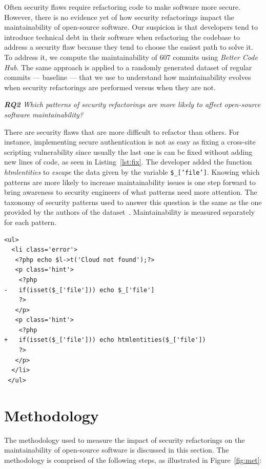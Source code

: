\documentclass[10pt,conference]{IEEEtran}
\newcounter{lstannotation}
\begin{document}
Often security flaws require refactoring code to make software more secure.
However, there is no evidence yet of how security refactorings impact the
maintainability of open-source software. Our suspicion is that developers tend
to introduce technical debt in their software when refactoring the codebase to
address a security flaw because they tend to choose the easiest path to solve
it. To address it, we compute the maintainability of $607$ commits using
\emph{Better Code Hub}. The same approach is applied to a randomly generated
dataset of regular commits --- baseline --- that we use to understand how
maintainability evolves when security refactorings are performed versus when
they are not.

\begin{framed}
\textit{\textbf{RQ2} Which patterns of security refactorings are more likely to
affect open-source software maintainability?}
\end{framed}

There are security flaws that are more difficult to refactor than others. For
instance, implementing secure authentication is not as easy as fixing a
cross-site scripting vulnerability since usually the last one is can be fixed
without adding new lines of code, as seen in Listing~\ref{lst:fix}. The developer added the function \emph{htmlentities} to
\textit{escape} the data given by the variable \texttt{\$\_['file']}. Knowing which
patterns are more likely to increase maintainability issues is one step forward
to bring awareness to security engineers of what patterns need more attention.
The taxonomy of security patterns used to answer this question is the same as
the one provided by the authors of the dataset~\cite{Reis:2017:IJSSE}.
Maintainability is measured separately for each pattern.

\setcounter{lstannotation}{0}
\begin{lstlisting}[style={PHPStyle}, caption={Fix provided by \texttt{nextcloud/server} developers to a \\Cross-Site Scripting vulnerability},label={lst:fix}]
 <ul>
  <li class='error'>
   <?php echo $l->t('Cloud not found');?>
   <p class='hint'>
    <?php
-   if(isset($_['file'])) echo $_['file']
    ?>
   </p>
   <p class='hint'>
    <?php
+   if(isset($_['file'])) echo htmlentities($_['file'])
    ?>
   </p>
  </li>
 </ul>

\end{lstlisting}

\section{Methodology}\label{sec:methodology}
%
The methodology used to measure the impact of security refactorings on the
maintainability of open-source software is discussed in this section. The
methodology is comprised of the following steps, as illustrated in
Figure~\ref{fig:met}:
\end{document}
